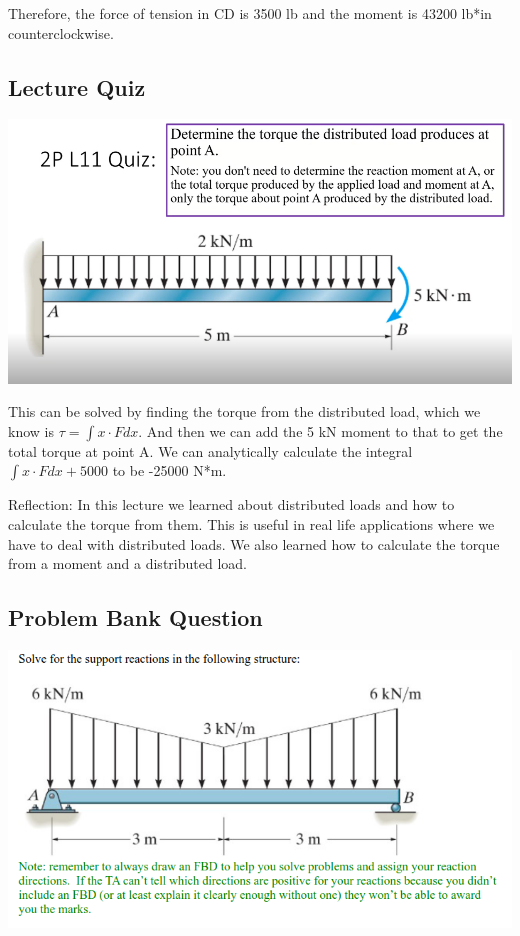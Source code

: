 \documentclass{article}[14pt, letterpaper, Times New Roman]
\begin{document}
Therefore, the force of tension in CD is 3500 lb and the moment is 43200 lb*in counterclockwise.

\subsection{Lecture Quiz}

\includegraphics[width=15cm]{l11-quiz.png}

This can be solved by finding the torque from the distributed load, which we know is $\tau=\int x \cdot Fdx$.
And then we can add the 5 kN moment to that to get the total torque at point A.
We can analytically calculate the integral $\int x \cdot Fdx + 5000$ to be -25000 N*m.

\medskip

Reflection: In this lecture we learned about distributed loads and how to calculate the torque from them. This is useful in real life applications where we have to deal with distributed loads. We also learned how to calculate the torque from a moment and a distributed load.

\subsection{Problem Bank Question}

\includegraphics[width=15cm]{l11-pbq.png}
\end{document}
